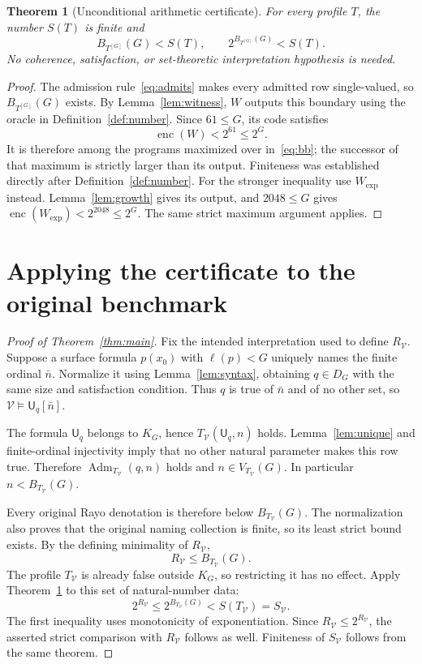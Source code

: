 \documentclass[11pt]{article}
\newtheorem{theorem}{Theorem}[section]
\newcommand{\V}{\mathcal V}
\newcommand{\U}{\mathsf U}
\newcommand{\Adm}{\operatorname{Adm}}
\newcommand{\enc}{\operatorname{enc}}
\begin{document}
\begin{theorem}[Unconditional arithmetic certificate]\label{thm:uniform}
For every profile $T$, the number $S(T)$ is finite and
\[
                  B_{T^{[G]}}(G)<S(T),\qquad
                  2^{B_{T^{[G]}}(G)}<S(T).
\]
No coherence, satisfaction, or set-theoretic interpretation hypothesis is
needed.
\end{theorem}
\begin{proof}
The admission rule~\eqref{eq:admits} makes every admitted row single-valued,
so $B_{T^{[G]}}(G)$ exists. By Lemma~\ref{lem:witness}, $W$ outputs this
boundary using the oracle in Definition~\ref{def:number}. Since
$61\leq G$, its code satisfies
\[
                  \enc(W)<2^{61}\leq2^G.
\]
It is therefore among the programs maximized over in~\eqref{eq:bb}; the
successor of that maximum is strictly larger than its output. Finiteness was
established directly after Definition~\ref{def:number}.
For the stronger inequality use $W_{\exp}$ instead. Lemma~\ref{lem:growth}
gives its output, and $2048\leq G$ gives
$\enc(W_{\exp})<2^{2048}\leq2^G$. The same strict maximum argument applies.
\end{proof}

\section{Applying the certificate to the original benchmark}

\begin{proof}[Proof of Theorem~\ref{thm:main}]
Fix the intended interpretation used to define $R_{\V}$. Suppose a surface
formula $p(x_0)$ with $\ell(p)<G$ uniquely names the finite ordinal $\bar n$.
Normalize it using Lemma~\ref{lem:syntax}, obtaining $q\in D_G$ with the same
size and satisfaction condition. Thus $q$ is true of $\bar n$ and of no
other set, so $\V\models\U_q[\bar n]$.

The formula $\U_q$ belongs to $K_G$, hence $T_{\V}(\U_q,n)$ holds.
Lemma~\ref{lem:unique} and finite-ordinal injectivity imply that no other
natural parameter makes this row true. Therefore
$\Adm_{T_{\V}}(q,n)$ holds and $n\in V_{T_{\V}}(G)$. In particular
$n<B_{T_{\V}}(G)$.

Every original Rayo denotation is therefore below $B_{T_{\V}}(G)$.
The normalization also proves that the original naming collection is finite,
so its least strict bound exists. By the defining minimality of $R_{\V}$,
\[
                         R_{\V}\leq B_{T_{\V}}(G).
\]
The profile $T_{\V}$ is already false outside $K_G$, so restricting it has no
effect. Apply Theorem~\ref{thm:uniform} to this set of natural-number data:
\[
                2^{R_{\V}}\leq 2^{B_{T_{\V}}(G)}<S(T_{\V})=S_{\V}.
\]
The first inequality uses monotonicity of exponentiation. Since
$R_{\V}\leq2^{R_{\V}}$, the asserted strict comparison with $R_{\V}$ follows
as well. Finiteness of $S_{\V}$ follows from the same theorem.
\end{proof}
\end{document}
